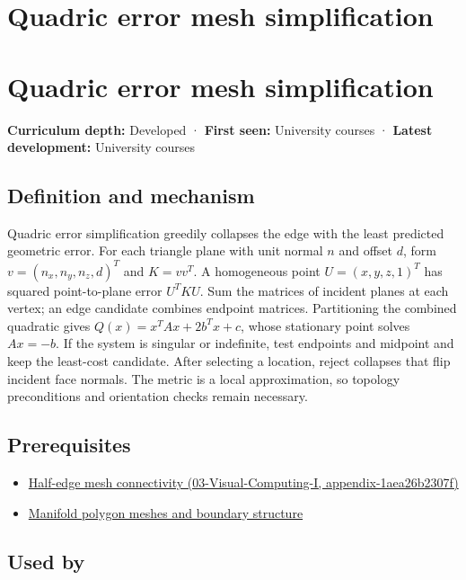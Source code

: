 \hypertarget{appendix-1dd4ad54ca57}{}
\section*{Quadric error mesh simplification}
\section{Quadric error mesh simplification}\label{quadric-error-mesh-simplification}

\textbf{Curriculum depth:} Developed · \textbf{First seen:} University courses · \textbf{Latest development:} University courses

\subsection{Definition and mechanism}\label{definition-and-mechanism}

Quadric error simplification greedily collapses the edge with the least predicted geometric error. For each triangle plane with unit normal \(n\) and offset \(d\), form \(v=(n_x,n_y,n_z,d)^T\) and \(K=vv^T\). A homogeneous point \(U=(x,y,z,1)^T\) has squared point-to-plane error \(U^TKU\). Sum the matrices of incident planes at each vertex; an edge candidate combines endpoint matrices. Partitioning the combined quadratic gives \(Q(x)=x^TAx+2b^Tx+c\), whose stationary point solves \(Ax=-b\). If the system is singular or indefinite, test endpoints and midpoint and keep the least-cost candidate. After selecting a location, reject collapses that flip incident face normals. The metric is a local approximation, so topology preconditions and orientation checks remain necessary.

\subsection{Prerequisites}\label{prerequisites}

\begin{itemize}
\tightlist
\item
  \href{}{Half-edge mesh connectivity (03-Visual-Computing-I, appendix-1aea26b2307f)}
\item
  \hyperref[appendix-fab348609369]{Manifold polygon meshes and boundary structure}
\end{itemize}

\subsection{Used by}\label{used-by}

